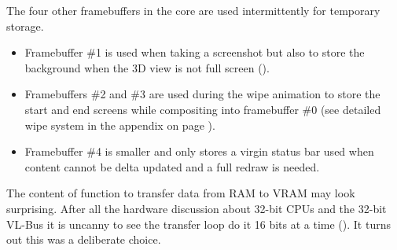 \par
The four other framebuffers in the core are used intermittently for temporary storage.
\begin{itemize}
\item Framebuffer \#1 is used when taking a screenshot but also to store the background when the 3D view is not full screen ().

\item Framebuffers \#2 and \#3 are used during the wipe animation to store the start and end screens while compositing into framebuffer \#0 (see detailed wipe system in the appendix on page \pageref{label_melt}).
\item Framebuffer \#4 is smaller and only stores a virgin status bar used when content cannot be delta updated and a full redraw is needed.
\end{itemize}
\par



The content of function  to transfer data from RAM to VRAM may look surprising. After all the hardware discussion about 32-bit CPUs and the 32-bit VL-Bus it is uncanny to see the transfer loop do it 16 bits at a time (). It turns out this was a deliberate choice.\\
\par
{}\\
\par
{}
\par
